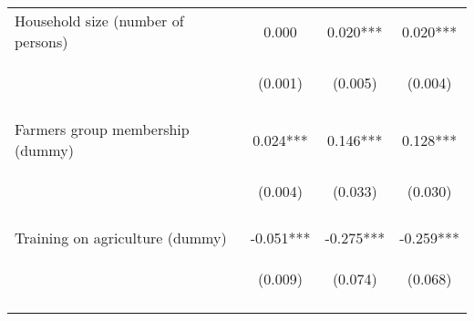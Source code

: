 \begin{center}
\begin{tabular}{lccc}
Household size (number of persons) & 0.000 & 0.020*** & 0.020*** \\
 & \begin{footnotesize}(0.001)\end{footnotesize} & \begin{footnotesize}(0.005)\end{footnotesize} & \begin{footnotesize}(0.004)\end{footnotesize} \\
\vspace{4pt} & \begin{footnotesize}[0.485]\end{footnotesize} & \begin{footnotesize}[0.000]\end{footnotesize} & \begin{footnotesize}[0.000]\end{footnotesize} \\
Farmers group membership (dummy) & 0.024*** & 0.146*** & 0.128*** \\
 & \begin{footnotesize}(0.004)\end{footnotesize} & \begin{footnotesize}(0.033)\end{footnotesize} & \begin{footnotesize}(0.030)\end{footnotesize} \\
\vspace{4pt} & \begin{footnotesize}[0.000]\end{footnotesize} & \begin{footnotesize}[0.000]\end{footnotesize} & \begin{footnotesize}[0.000]\end{footnotesize} \\
Training on agriculture (dummy) & -0.051*** & -0.275*** & -0.259*** \\
 & \begin{footnotesize}(0.009)\end{footnotesize} & \begin{footnotesize}(0.074)\end{footnotesize} & \begin{footnotesize}(0.068)\end{footnotesize} \\
\vspace{4pt} & \begin{footnotesize}[0.000]\end{footnotesize} & \begin{footnotesize}[0.000]\end{footnotesize} & \begin{footnotesize}[0.000]\end{footnotesize} \\

\end{tabular}
\end{center}
